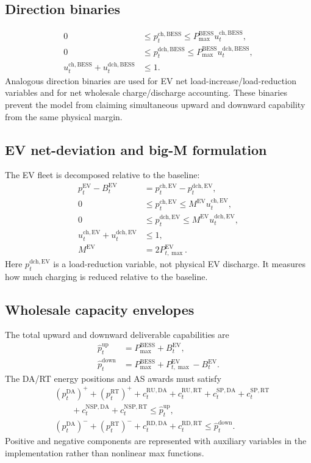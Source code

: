 \documentclass[final,5p,times]{elsarticle}
\newcommand{\EV}{\mathrm{EV}}
\newcommand{\BESS}{\mathrm{BESS}}
\newcommand{\DA}{\mathrm{DA}}
\newcommand{\RT}{\mathrm{RT}}
\newcommand{\RU}{\mathrm{RU}}
\newcommand{\RD}{\mathrm{RD}}
\newcommand{\SP}{\mathrm{SP}}
\newcommand{\NSP}{\mathrm{NSP}}
\newcommand{\ch}{\mathrm{ch}}
\newcommand{\dch}{\mathrm{dch}}
\newcommand{\up}{\mathrm{up}}
\newcommand{\down}{\mathrm{down}}
\begin{document}
\subsection{Direction binaries}
\begin{align}
0&\le p_t^{\ch,\BESS}\le P_{\max}^{\BESS}u_t^{\ch,\BESS},\label{eq:app_bess_chbin}\\
0&\le p_t^{\dch,\BESS}\le P_{\max}^{\BESS}u_t^{\dch,\BESS},\label{eq:app_bess_dchbin}\\
u_t^{\ch,\BESS}+u_t^{\dch,\BESS}&\le 1.\label{eq:app_bess_dirbin}
\end{align}
Analogous direction binaries are used for EV net load-increase/load-reduction variables and for net wholesale charge/discharge accounting. These binaries prevent the model from claiming simultaneous upward and downward capability from the same physical margin.

\subsection{EV net-deviation and big-M formulation}
The EV fleet is decomposed relative to the baseline:
\begin{align}
p_t^{\EV}-B_t^{\EV}&=p_t^{\ch,\EV}-p_t^{\dch,\EV},\label{eq:app_ev_deviation}\\
0&\le p_t^{\ch,\EV}\le M^{\EV}u_t^{\ch,\EV},\label{eq:app_ev_ch}\\
0&\le p_t^{\dch,\EV}\le M^{\EV}u_t^{\dch,\EV},\label{eq:app_ev_dch}\\
u_t^{\ch,\EV}+u_t^{\dch,\EV}&\le 1,\label{eq:app_ev_dir}\\
M^{\EV}&=2P_{t,\max}^{\EV}.\label{eq:app_ev_bigM}
\end{align}
Here $p_t^{\dch,\EV}$ is a load-reduction variable, not physical EV discharge. It measures how much charging is reduced relative to the baseline.

\subsection{Wholesale capacity envelopes}
The total upward and downward deliverable capabilities are
\begin{align}
\hat p_t^{\up}&=P_{\max}^{\BESS}+B_t^{\EV},\label{eq:app_upcap}\\
\hat p_t^{\down}&=P_{\max}^{\BESS}+P_{t,\max}^{\EV}-B_t^{\EV}.\label{eq:app_downcap}
\end{align}
The DA/RT energy positions and AS awards must satisfy
\begin{align}
&(p_t^{\DA})^+ +(p_t^{\RT})^+
+c_t^{\RU,\DA}+c_t^{\RU,\RT}
+c_t^{\SP,\DA}+c_t^{\SP,\RT}\nonumber\\
&\qquad +c_t^{\NSP,\DA}+c_t^{\NSP,\RT}
\le \hat p_t^{\up},\label{eq:app_upenv}\\
&(p_t^{\DA})^- +(p_t^{\RT})^-
+c_t^{\RD,\DA}+c_t^{\RD,\RT}
\le \hat p_t^{\down}.\label{eq:app_downenv}
\end{align}
Positive and negative components are represented with auxiliary variables in the implementation rather than nonlinear max functions.
\end{document}
